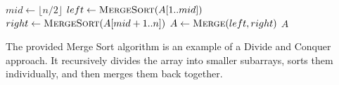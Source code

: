 \documentclass[12pt]{book} %
\begin{document}
\FloatBarrier
\begin{algorithm}
\caption{Merge Sort Algorithm}
\begin{algorithmic}[1]
        \State $mid \gets \lfloor n/2 \rfloor$
        \State $left \gets \Call{MergeSort}{A[1..mid]}$
        \State $right \gets \Call{MergeSort}{A[mid+1..n]}$
        \State $A \gets \Call{Merge}{left, right}$
    \EndIf
    \State \Return $A$
\EndFunction
\end{algorithmic}
\end{algorithm}
\FloatBarrier

The provided Merge Sort algorithm is an example of a Divide and Conquer approach. It recursively divides the array into smaller subarrays, sorts them individually, and then merges them back together.
\end{document}
